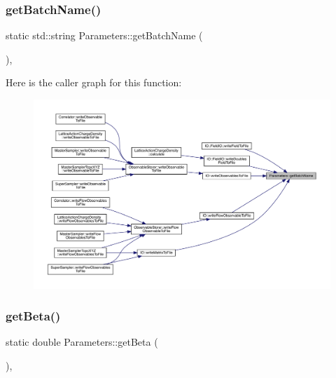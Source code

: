 \subsubsection{\texorpdfstring{getBatchName()}{getBatchName()}}
{\footnotesize\ttfamily static std\+::string Parameters\+::get\+Batch\+Name (\begin{DoxyParamCaption}{ }\end{DoxyParamCaption})\hspace{0.3cm}{\ttfamily [inline]}, {\ttfamily [static]}}

Here is the caller graph for this function\+:
\nopagebreak
\begin{figure}[H]
\begin{center}
\leavevmode
\includegraphics[width=350pt]{class_parameters_a181a773d23fdb19d0c4f35e6cf2d5649_icgraph}
\end{center}
\end{figure}
\mbox{\label{class_parameters_ae5c64523dc50dca13b417fe3d9e4175c}} 
\subsubsection{\texorpdfstring{getBeta()}{getBeta()}}
{\footnotesize\ttfamily static double Parameters\+::get\+Beta (\begin{DoxyParamCaption}{ }\end{DoxyParamCaption})\hspace{0.3cm}{\ttfamily [inline]}, {\ttfamily [static]}}

